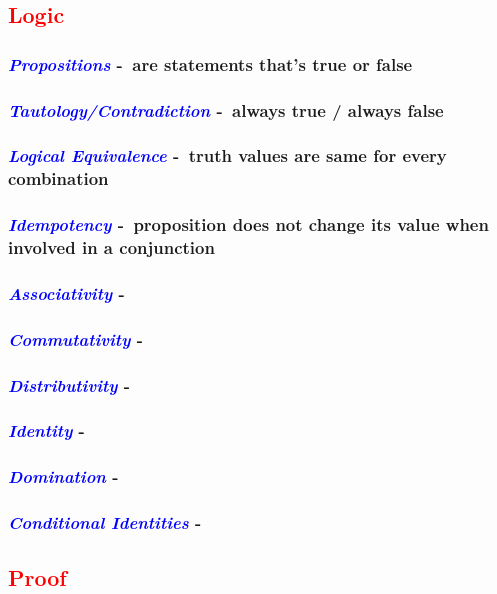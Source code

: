 \documentclass{article}
\def\topic#1{\textcolor{red}{\sc #1}}
\def\sect#1{\textcolor{blue}{\textsl{#1}}}
\begin{document}
  \begin{center}
    \section*{\topic{Logic}}
  \end{center}
  \subsubsection*{\sect{Propositions} -\ are statements that's true or false}
  \subsubsection*{\sect{Tautology/Contradiction} -\ always true / always false}
  \subsubsection*{\sect{Logical Equivalence} -\ truth values are same for every combination}
  \subsubsection*{\sect{Idempotency} -\ proposition does not change its value when involved in a conjunction}
  \subsubsection*{\sect{Associativity} -\ }
  \subsubsection*{\sect{Commutativity} -\ }
  \subsubsection*{\sect{Distributivity} -\ }
  \subsubsection*{\sect{Identity} -\ }
  \subsubsection*{\sect{Domination} -\ }
  \subsubsection*{\sect{Conditional Identities} -\ }
  \clearpage
  \begin{center}
    \section*{\topic{Proof}}
  \end{center}
\end{document}
